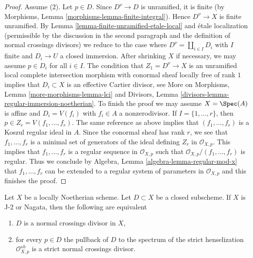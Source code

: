 \begin{proof}
\medskip\noindent
Assume (2). Let $p \in D$. Since $D^\nu \to D$ is unramified, it is
finite (by Morphisms, Lemma \ref{morphisms-lemma-finite-integral}).
Hence $D^\nu \to X$ is finite unramified.
By Lemma \ref{lemma-finite-unramified-etale-local}
and \'etale localization (permissible by the discussion
in the second paragraph and the definition of normal
crossings divisors) we reduce to the case where
$D^\nu = \coprod_{i \in I} D_i$
with $I$ finite and $D_i \to U$ a closed immersion.
After shrinking $X$ if necessary, we may assume
$p \in D_i$ for all $i \in I$. The condition that $Z_1 =  D^\nu \to X$ is an
unramified local complete intersection morphism
with conormal sheaf locally free of rank $1$
implies that $D_i \subset X$ is an effective Cartier divisor, see
More on Morphisms, Lemma \ref{more-morphisms-lemma-lci} and
Divisors, Lemma \ref{divisors-lemma-regular-immersion-noetherian}.
To finish the proof we may assume $X = \Spec(A)$ is affine
and $D_i = V(f_i)$ with $f_i \in A$ a nonzerodivisor.
If $I = \{1, \ldots, r\}$, then $p \in Z_r = V(f_1, \ldots, f_r)$.
The same reference as above implies that
$(f_1, \ldots, f_r)$ is a Koszul regular ideal in $A$.
Since the conormal sheaf has rank $r$, we see that
$f_1, \ldots, f_r$ is a minimal set of generators of
the ideal defining $Z_r$ in $\mathcal{O}_{X, p}$.
This implies that $f_1, \ldots, f_r$ is a regular sequence
in $\mathcal{O}_{X, p}$ such that $\mathcal{O}_{X, p}/(f_1, \ldots, f_r)$
is regular. Thus we conclude by
Algebra, Lemma \ref{algebra-lemma-regular-mod-x}
that $f_1, \ldots, f_r$ can be extended to a regular system of parameters
in $\mathcal{O}_{X, p}$ and this finishes the proof.
\end{proof}

\begin{lemma}
\label{lemma-characterize-normal-crossings}
Let $X$ be a locally Noetherian scheme. Let $D \subset X$ be a closed
subscheme. If $X$ is J-2 or Nagata, then the following are equivalent
\begin{enumerate}
\item $D$ is a normal crossings divisor in $X$,
\item for every $p \in D$ the pullback of $D$ to the spectrum of the
strict henselization $\mathcal{O}_{X, p}^{sh}$
is a strict normal crossings divisor.
\end{enumerate}
\end{lemma}

